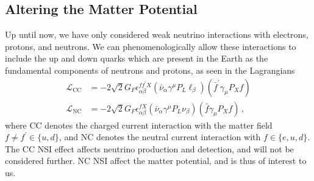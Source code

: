 \subsection{Altering the Matter Potential}
Up until now, we have only considered weak neutrino interactions with electrons, protons, and neutrons.
We can phenomenologically allow these interactions to include the up and down quarks which are present 
in the Earth as the fundamental components of neutrons and protons, as seen in the Lagrangians
\begin{align*}
    \mathcal{L}_{\mathrm{CC}} &= -2 \sqrt{2} G_{F} \epsilon_{\alpha \beta}^{f f^{\prime} X}\left(\bar{\nu}_{\alpha} \gamma^{\mu} P_{L} \ell_{\beta}\right)\left(\bar{f}^{\prime} \gamma_{\mu} P_{X} f\right) \\
    \mathcal{L}_{\mathrm{NC}} &= -2 \sqrt{2} G_{F} \epsilon_{\alpha \beta}^{f X}\left(\bar{\nu}_{\alpha} \gamma^{\mu} P_{L} \nu_{\beta}\right)\left(\bar{f} \gamma_{\mu} P_{X} f\right)\,,
\end{align*}
where CC denotes the charged current interaction with the matter field $f\neq f^\prime \in \{u,d\}$, and NC denotes the neutral current interaction with 
$f \in \{e,u,d\}$. The CC NSI effect affects neutrino production and detection, and will not be considered further. NC NSI affect the matter potential, 
and is thus of interest to us.

